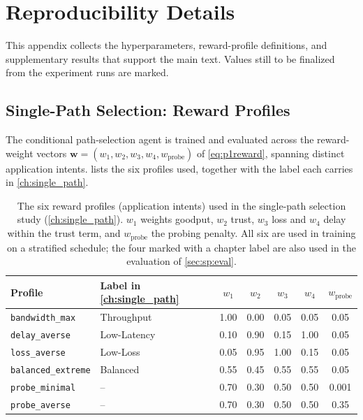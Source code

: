 \chapter{Reproducibility Details}
\label{app:reproducibility}

This appendix collects the hyperparameters, reward-profile definitions, and supplementary results that
support the main text. Values still to be finalized from the experiment runs are marked.

\section{Single-Path Selection: Reward Profiles}
\label{app:p1profiles}

The conditional path-selection agent is trained and evaluated across the reward-weight vectors
$\mathbf{w} = (w_1, w_2, w_3, w_4, w_{\text{probe}})$ of \cref{eq:p1reward}, spanning distinct application
intents.  lists the six profiles used, together with the label each carries in
\cref{ch:single_path}.

\begin{table}[h]
  \centering
  \caption[The six reward profiles of the single-path study]{The six reward profiles (application intents) used in the single-path selection study
  (\cref{ch:single_path}). $w_1$ weights goodput, $w_2$ trust, $w_3$ loss and $w_4$ delay within the
  trust term, and $w_{\text{probe}}$ the probing penalty. All six are used in training on a stratified
  schedule; the four marked with a chapter label are also used in the evaluation of
  \cref{sec:sp:eval}.}
  \label{tab:app:profiles}
  \begin{tabular}{llccccc}
    \toprule
    Profile & Label in \cref{ch:single_path} & $w_1$ & $w_2$ & $w_3$ & $w_4$ & $w_{\text{probe}}$ \\
    \midrule
    \texttt{bandwidth\_max}    & Throughput  & 1.00 & 0.00 & 0.05 & 0.05 & 0.05 \\
    \texttt{delay\_averse}     & Low-Latency & 0.10 & 0.90 & 0.15 & 1.00 & 0.05 \\
    \texttt{loss\_averse}      & Low-Loss    & 0.05 & 0.95 & 1.00 & 0.15 & 0.05 \\
    \texttt{balanced\_extreme} & Balanced    & 0.55 & 0.45 & 0.55 & 0.55 & 0.05 \\
    \texttt{probe\_minimal}    & --          & 0.70 & 0.30 & 0.50 & 0.50 & 0.001 \\
    \texttt{probe\_averse}     & --          & 0.70 & 0.30 & 0.50 & 0.50 & 0.35 \\
    \bottomrule
  \end{tabular}
\end{table}

